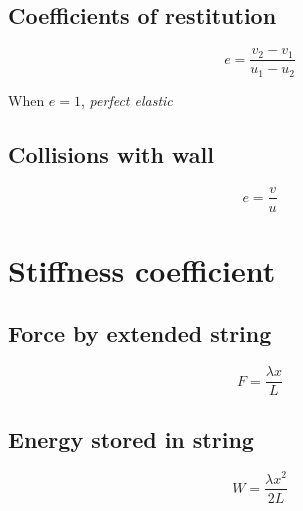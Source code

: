 \documentclass[a4paper,9pt]{scrartcl}
\begin{document}
    \subsection{Coefficients of restitution}

    \begin{displaymath}
        e = \frac{v_2-v_1}{u_1-u_2}
    \end{displaymath}

    When $e=1$, \textit{perfect elastic}

    \subsection{Collisions with wall}

    \begin{displaymath}
        e = \frac{v}{u}
    \end{displaymath}


    \section{Stiffness coefficient}

    \subsection{Force by extended string}
    \begin{displaymath}
        F = \frac{{\lambda}x}{L}
    \end{displaymath}

    \subsection{Energy stored in string}
    \begin{displaymath}
        W = \frac{{\lambda}x^2}{2L}
    \end{displaymath}
\end{document}
